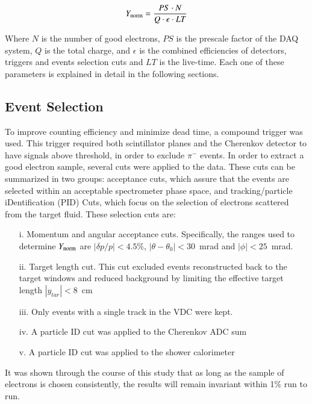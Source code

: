 \documentclass[review,numbers,sort&compress]{elsarticle}
\begin{document}
\begin{equation}
Y_{\rm{norm}} = \frac{PS \cdot N}{ Q \cdot \epsilon \cdot LT }
\label{eq:yield}
\end{equation}

\noindent Where $N$ is the number of good electrons, $PS$ is the prescale factor of the DAQ system, 
$Q$ is the total charge, and $\epsilon $ is the combined efficiencies of detectors, triggers 
and events selection cuts and $LT$ is the live-time. Each one of these parameters is explained 
in detail in the following sections.

\subsection{Event Selection}
To improve counting efficiency and minimize dead time, a compound trigger was used. This trigger required both scintillator planes 
and the Cherenkov detector to have signals above threshold, in order to exclude $\pi^{-}$ events. In order to extract a good 
electron sample, several cuts were applied to the data. These cuts can be summarized in two groups: acceptance cuts, which 
assure that the events are selected within an acceptable spectrometer phase space, and 
tracking/particle iDentification (PID) Cuts, which focus on the selection of electrons scattered from the target fluid.
These selection cuts are:

\begin{itemize}
\item[i.] Momentum and angular acceptance cuts. Specifically, the ranges used to determine $Y_{\rm{norm}}$ are $|\delta p/p| < 4.5\%$,  
$|\theta-\theta_{0}| < 30$~mrad and $|\phi| < 25$~mrad.

\item[ii.] Target length cut. This cut excluded events reconstructed back to the target windows 
and reduced background by limiting the effective target length $|y_{tar}|<8$~cm 

\item[iii.] Only events with a single track in the VDC were kept.

\item[iv.] A particle ID cut was applied to the Cherenkov ADC sum

\item[v.] A particle ID cut was applied to the shower calorimeter

\end{itemize}

It was shown through the course of this study that as long as the sample of electrons is chosen consistently, 
the results will remain invariant within 1$\%$ run to run.
\end{document}
